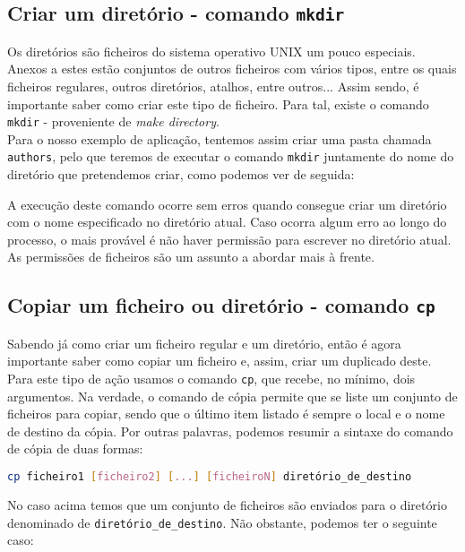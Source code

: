 \documentclass[a4paper, onecolumn, 10pt]{report}
\begin{document}
\subsection{Criar um diretório - comando \texttt{mkdir}}

Os diretórios são ficheiros do sistema operativo UNIX um pouco especiais. Anexos a estes estão conjuntos de outros ficheiros com vários tipos, entre os quais ficheiros regulares, outros diretórios, atalhos, entre outros... Assim sendo, é importante saber como criar este tipo de ficheiro. Para tal, existe o comando \texttt{mkdir} - proveniente de \textit{make directory}. \\
Para o nosso exemplo de aplicação, tentemos assim criar uma pasta chamada \texttt{au\-thors}, pelo que teremos de executar o comando \texttt{mkdir} juntamente do nome do diretório que pretendemos criar, como podemos ver de seguida:



A execução deste comando ocorre sem erros quando consegue criar um diretório com o nome especificado no diretório atual. Caso ocorra algum erro ao longo do processo, o mais provável é não haver permissão para escrever no diretório atual. As permissões de ficheiros são um assunto a abordar mais à frente.

\subsection{Copiar um ficheiro ou diretório - comando \texttt{cp}}

Sabendo já como criar um ficheiro regular e um diretório, então é agora importante saber como copiar um ficheiro e, assim, criar um duplicado deste. Para este tipo de ação usamos o comando \texttt{cp}, que recebe, no mínimo, dois argumentos. Na verdade, o comando de cópia permite que se liste um conjunto de ficheiros para copiar, sendo que o último item listado é sempre o local e o nome de destino da cópia. Por outras palavras, podemos resumir a sintaxe do comando de cópia de duas formas:

\begin{lstlisting}[language=bash, style=console]
cp ficheiro1 [ficheiro2] [...] [ficheiroN] diretório_de_destino
\end{lstlisting}

No caso acima temos que um conjunto de ficheiros são enviados para o diretório denominado de \texttt{diretório\_de\_destino}. Não obstante, podemos ter o seguinte caso:
\end{document}
